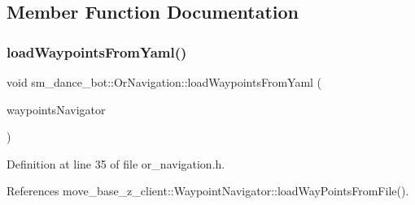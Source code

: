 \subsection{Member Function Documentation}
\mbox{\label{classsm__dance__bot_1_1OrNavigation_a1f092ffe3a1b29ae9ea6623aff00ab16}} 
\subsubsection{\texorpdfstring{load\+Waypoints\+From\+Yaml()}{loadWaypointsFromYaml()}}
{\footnotesize\ttfamily void sm\+\_\+dance\+\_\+bot\+::\+Or\+Navigation\+::load\+Waypoints\+From\+Yaml (\begin{DoxyParamCaption}\item[{\hyperlink{classmove__base__z__client_1_1WaypointNavigator}{Waypoint\+Navigator} $\ast$}]{waypoints\+Navigator }\end{DoxyParamCaption})\hspace{0.3cm}{\ttfamily [inline]}}



Definition at line 35 of file or\+\_\+navigation.\+h.



References move\+\_\+base\+\_\+z\+\_\+client\+::\+Waypoint\+Navigator\+::load\+Way\+Points\+From\+File().


